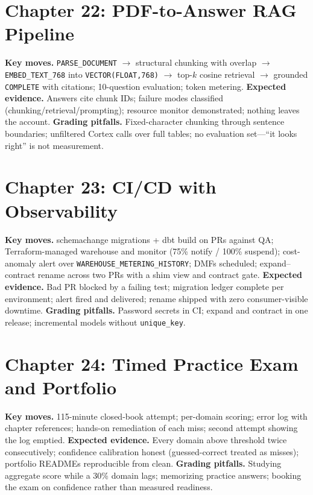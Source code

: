 \section{Chapter 22: PDF-to-Answer RAG Pipeline}
\textbf{Key moves.} \texttt{PARSE\_DOCUMENT} $\rightarrow$ structural chunking with overlap $\rightarrow$ \texttt{EMBED\_TEXT\_768} into \texttt{VECTOR(FLOAT,768)} $\rightarrow$ top-$k$ cosine retrieval $\rightarrow$ grounded \texttt{COMPLETE} with citations; 10-question evaluation; token metering.
\textbf{Expected evidence.} Answers cite chunk IDs; failure modes classified (chunking/retrieval/prompting); resource monitor demonstrated; nothing leaves the account.
\textbf{Grading pitfalls.} Fixed-character chunking through sentence boundaries; unfiltered Cortex calls over full tables; no evaluation set---``it looks right'' is not measurement.

\section{Chapter 23: CI/CD with Observability}
\textbf{Key moves.} schemachange migrations + dbt build on PRs against QA; Terraform-managed warehouse and monitor (75\% notify / 100\% suspend); cost-anomaly alert over \texttt{WAREHOUSE\_METERING\_HISTORY}; DMFs scheduled; expand--contract rename across two PRs with a shim view and contract gate.
\textbf{Expected evidence.} Bad PR blocked by a failing test; migration ledger complete per environment; alert fired and delivered; rename shipped with zero consumer-visible downtime.
\textbf{Grading pitfalls.} Password secrets in CI; expand and contract in one release; incremental models without \texttt{unique\_key}.

\section{Chapter 24: Timed Practice Exam and Portfolio}
\textbf{Key moves.} 115-minute closed-book attempt; per-domain scoring; error log with chapter references; hands-on remediation of each miss; second attempt showing the log emptied.
\textbf{Expected evidence.} Every domain above threshold twice consecutively; confidence calibration honest (guessed-correct treated as misses); portfolio READMEs reproducible from clean.
\textbf{Grading pitfalls.} Studying aggregate score while a 30\% domain lags; memorizing practice answers; booking the exam on confidence rather than measured readiness.
